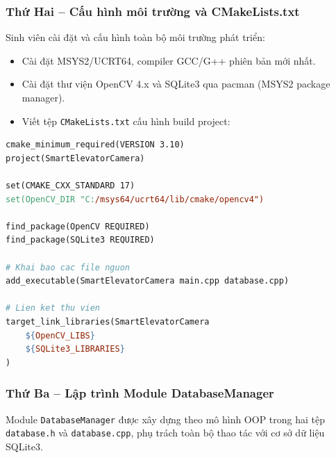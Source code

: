 \documentclass[12pt,a4paper]{article}
\begin{document}
\subsubsection{Thứ Hai -- Cấu hình môi trường và CMakeLists.txt}

Sinh viên cài đặt và cấu hình toàn bộ môi trường phát triển:
\begin{itemize}[leftmargin=1.5cm]
    \item Cài đặt MSYS2/UCRT64, compiler GCC/G++ phiên bản mới nhất.
    \item Cài đặt thư viện OpenCV 4.x và SQLite3 qua pacman (MSYS2 package manager).
    \item Viết tệp \texttt{CMakeLists.txt} cấu hình build project:
\end{itemize}

\begin{lstlisting}[language=make, caption={Tệp CMakeLists.txt cấu hình build dự án}]
cmake_minimum_required(VERSION 3.10)
project(SmartElevatorCamera)

set(CMAKE_CXX_STANDARD 17)
set(OpenCV_DIR "C:/msys64/ucrt64/lib/cmake/opencv4")

find_package(OpenCV REQUIRED)
find_package(SQLite3 REQUIRED)

# Khai bao cac file nguon
add_executable(SmartElevatorCamera main.cpp database.cpp)

# Lien ket thu vien
target_link_libraries(SmartElevatorCamera
    ${OpenCV_LIBS}
    ${SQLite3_LIBRARIES}
)
\end{lstlisting}

\subsubsection{Thứ Ba -- Lập trình Module DatabaseManager}

Module \texttt{DatabaseManager} được xây dựng theo mô hình OOP trong hai tệp \texttt{database.h} và \texttt{database.cpp}, phụ trách toàn bộ thao tác với cơ sở dữ liệu SQLite3.
\end{document}
